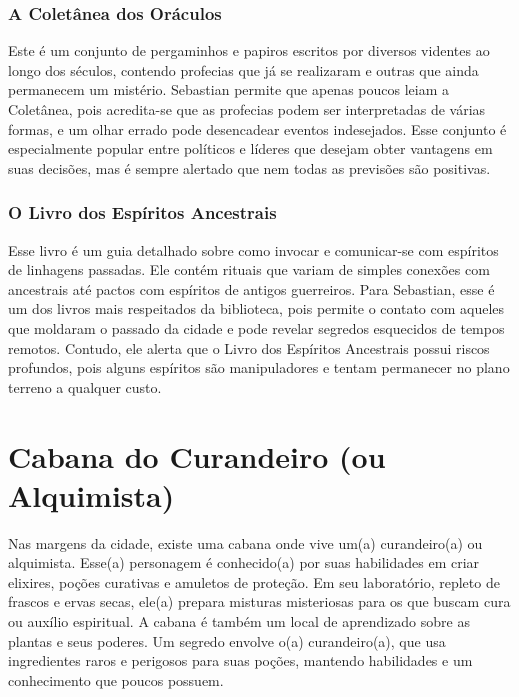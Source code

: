 \subsubsection{A Coletânea dos Oráculos}
Este é um conjunto de pergaminhos e papiros escritos por diversos videntes ao longo dos séculos, contendo profecias que já se realizaram e outras que ainda permanecem um mistério. Sebastian permite que apenas poucos leiam a Coletânea, pois acredita-se que as profecias podem ser interpretadas de várias formas, e um olhar errado pode desencadear eventos indesejados. Esse conjunto é especialmente popular entre políticos e líderes que desejam obter vantagens em suas decisões, mas é sempre alertado que nem todas as previsões são positivas.

\subsubsection{O Livro dos Espíritos Ancestrais}
Esse livro é um guia detalhado sobre como invocar e comunicar-se com espíritos de linhagens passadas. Ele contém rituais que variam de simples conexões com ancestrais até pactos com espíritos de antigos guerreiros. Para Sebastian, esse é um dos livros mais respeitados da biblioteca, pois permite o contato com aqueles que moldaram o passado da cidade e pode revelar segredos esquecidos de tempos remotos. Contudo, ele alerta que o Livro dos Espíritos Ancestrais possui riscos profundos, pois alguns espíritos são manipuladores e tentam permanecer no plano terreno a qualquer custo.


\section{Cabana do Curandeiro (ou Alquimista)}
Nas margens da cidade, existe uma cabana onde vive um(a) curandeiro(a) ou alquimista. Esse(a) personagem é conhecido(a) por suas habilidades em criar elixires, poções curativas e amuletos de proteção. Em seu laboratório, repleto de frascos e ervas secas, ele(a) prepara misturas misteriosas para os que buscam cura ou auxílio espiritual. A cabana é também um local de aprendizado sobre as plantas e seus poderes. Um segredo envolve o(a) curandeiro(a), que usa ingredientes raros e perigosos para suas poções, mantendo habilidades e um conhecimento que poucos possuem.




